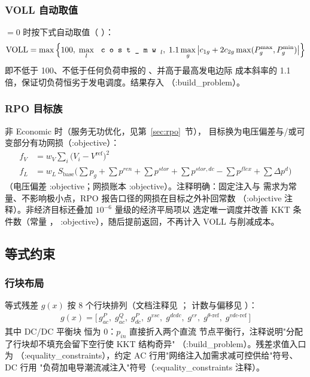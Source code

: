 \subsubsection*{VOLL 自动取值}
$=0$ 时按下式自动取值（
）：
\begin{align*}
\mathrm{VOLL}=\max\Big\{100,\;\max_{l}\,\fld{cost\_mw}_l,\;
1.1\max_{g}\big|c_{1g}+2c_{2g}\max(P^{\max}_g,P^{\min}_g)\big|\Big\}
\end{align*}
即不低于 100、不低于任何负荷申报的 、并高于最高发电边际
成本斜率的 1.1 倍，保证切负荷恒劣于发电调度。结果存入
（:build\_problem）。

\subsubsection*{RPO 目标族}
 非 Economic 时（服务无功优化，见第~\ref{sec:rpo}~节），
目标换为电压偏差与/或可变部分有功网损（:objective）：
\begin{align*}
f_{V}&=w_V\sum_{i}\big(V_i-V^{\mathrm{ref}}\big)^2\\
f_{L}&=w_L\,S_{\mathrm{base}}\Big(\sum p_g+\sum p^{ren}+\sum p^{stor}
+\sum p^{stor,dc}-\sum p^{flex}+\sum \Delta p^d\Big)
\end{align*}
（电压偏差 :objective；网损账本 :objective）。注释明确：固定注入与
需求为常量、不影响极小点，RPO 报告口径的网损在目标之外补回常数
（:objective 注释）。非经济目标还叠加 $10^{-6}$ 量级的经济平局项以
选定唯一调度并改善 KKT 条件数（常量 ，
:objective），随后提前返回，不再计入 VOLL 与削减成本。

\subsection{等式约束}

\subsubsection*{行块布局}
等式残差 $g(x)$ 按 8 个行块排列（文档注释见
；
计数与偏移见 ）：
\begin{align*}
g(x)=\big[\,g^P_{ac},\; g^Q_{ac},\; g^P_{dc},\; g^{vsc},\;
g^{dcdc},\; g^{er},\; g^{\theta\text{-ref}},\; g^{vdc\text{-ref}}\,\big]
\end{align*}
其中 DC/DC 平衡块  恒为 0：$p_{in}$ 直接折入两个直流
节点平衡行，注释说明"分配了行块却不填充会留下空行使 KKT 结构奇异"
（:build\_problem）。残差求值入口为 
（:equality\_constraints），约定 AC 行用"网络注入加需求减可控供给"符号、DC 行用
"负荷加电导潮流减注入"符号（:equality\_constraints 注释）。

